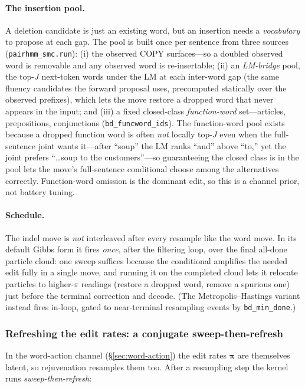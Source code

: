 \documentclass[11pt]{article}
\providecommand{\code}[1]{\texttt{#1}}
\providecommand{\actdist}{\bm{\pi}}            %
\begin{document}
\paragraph{The insertion pool.} A deletion candidate is just an existing word, but an insertion needs a \emph{vocabulary} to propose at each gap. The pool is built once per sentence from three sources (\code{pairhmm\_smc.run}): (i) the observed COPY surfaces---so a doubled observed word is removable and any observed word is re-insertable; (ii) an \emph{LM-bridge} pool, the top-$J$ next-token words under the LM at each inter-word gap (the same fluency candidates the forward proposal uses, precomputed statically over the observed prefixes), which lets the move restore a dropped word that never appears in the input; and (iii) a fixed closed-class \emph{function-word} set---articles, prepositions, conjunctions (\code{bd\_funcword\_ids}). The function-word pool exists because a dropped function word is often \emph{not} locally top-$J$ even when the full-sentence joint wants it---after ``soup'' the LM ranks ``and'' above ``to,'' yet the joint prefers ``\dots soup to the customers''---so guaranteeing the closed class is in the pool lets the move's full-sentence conditional choose among the alternatives correctly. Function-word omission is the dominant edit, so this is a channel prior, not battery tuning.

\paragraph{Schedule.} The indel move is \emph{not} interleaved after every resample like the word move. In its default Gibbs form it fires \emph{once}, after the filtering loop, over the final all-done particle cloud: one sweep suffices because the conditional amplifies the needed edit fully in a single move, and running it on the completed cloud lets it relocate particles to higher-$\pi$ readings (restore a dropped word, remove a spurious one) just before the terminal correction and decode. (The Metropolis--Hastings variant instead fires in-loop, gated to near-terminal resampling events by \code{bd\_min\_done}.)

\subsubsection{Refreshing the edit rates: a conjugate sweep-then-refresh}
\label{sec:rejuv-theta}

In the word-action channel (\S\ref{sec:word-action}) the edit rates $\actdist$ are themselves latent, so rejuvenation resamples them too. After a resampling step the kernel runs \emph{sweep-then-refresh}:
\end{document}
